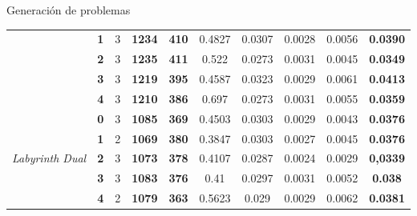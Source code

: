 \documentclass[11pt]{beamer}    %
\begin{document}
\begin{frame}{Generación de problemas}
\begin{table}[]
{\begin{tabular}{|c|c|cccccccc|}
                                                 & \textbf{1} & 3  & \textbf{1234} & \textbf{410} & 0.4827 & 0.0307 & 0.0028 & 0.0056 & \textbf{0.0390} \\ \cline{2-10} 
                                                 & \textbf{2} & 3  & \textbf{1235} & \textbf{411} & 0.522  & 0.0273 & 0.0031 & 0.0045 & \textbf{0.0349} \\ \cline{2-10} 
                                                 & \textbf{3} & 3  & \textbf{1219} & \textbf{395} & 0.4587 & 0.0323 & 0.0029 & 0.0061 & \textbf{0.0413} \\ \cline{2-10} 
                                                 & \textbf{4} & 3  & \textbf{1210} & \textbf{386} & 0.697  & 0.0273 & 0.0031 & 0.0055 & \textbf{0.0359} \\ \hline
        \multirow{5}{*}{\textit{Labyrinth Dual}} & \textbf{0} & 3  & \textbf{1085} & \textbf{369} & 0.4503 & 0.0303 & 0.0029 & 0.0043 & \textbf{0.0376} \\ \cline{2-10} 
                                                 & \textbf{1} & 2  & \textbf{1069} & \textbf{380} & 0.3847 & 0.0303 & 0.0027 & 0.0045 & \textbf{0.0376} \\ \cline{2-10} 
                                                 & \textbf{2} & 3  & \textbf{1073} & \textbf{378} & 0.4107 & 0.0287 & 0.0024 & 0.0029 & \textbf{0,0339} \\ \cline{2-10} 
                                                 & \textbf{3} & 3  & \textbf{1083} & \textbf{376} & 0.41   & 0.0297 & 0.0031 & 0.0052 & \textbf{0.038}  \\ \cline{2-10} 
                                                 & \textbf{4} & 2  & \textbf{1079} & \textbf{363} & 0.5623 & 0.029  & 0.0029 & 0.0062 & \textbf{0.0381} \\ \hline
        \end{tabular}%
        }
        \end{table}
    \end{frame}
\end{document}
